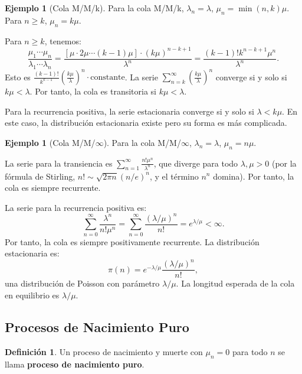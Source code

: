 \documentclass{article}
\theoremstyle{plain}
\theoremstyle{definition}
\newtheorem{Definicion}[Teorema]{Definici\'on}
\newtheorem{Ejemplo}[Teorema]{Ejemplo}
\begin{document}
\begin{Ejemplo}[Cola M/M/k]
  Para la cola M/M/k, $\lambda_n = \lambda$, $\mu_n = \min(n,k)\mu$. Para $n \geq k$, $\mu_n = k\mu$.
  
  Para $n \geq k$, tenemos:
  \[ \frac{\mu_1 \cdots \mu_n}{\lambda_1 \cdots \lambda_n} = \frac{[\mu \cdot 2\mu \cdots (k-1)\mu] \cdot (k\mu)^{n-k+1}}{\lambda^n} = \frac{(k-1)! k^{n-k+1} \mu^n}{\lambda^n}. \]
  Esto es $\frac{(k-1)!}{k^{k-1}} \left(\frac{k\mu}{\lambda}\right)^n \cdot \text{constante}$. La serie $\sum_{n=k}^\infty \left(\frac{k\mu}{\lambda}\right)^n$ converge si y solo si $k\mu < \lambda$. Por tanto, la cola es transitoria si $k\mu < \lambda$.
  
  Para la recurrencia positiva, la serie estacionaria converge si y solo si $\lambda < k\mu$. En este caso, la distribuci\'on estacionaria existe pero su forma es m\'as complicada.
\end{Ejemplo}

\begin{Ejemplo}[Cola M/M/$\infty$]
  Para la cola M/M/$\infty$, $\lambda_n = \lambda$, $\mu_n = n\mu$.
  
  La serie para la transiencia es $\sum_{n=1}^\infty \frac{n! \mu^n}{\lambda^n}$, que diverge para todo $\lambda, \mu > 0$ (por la f\'ormula de Stirling, $n! \sim \sqrt{2\pi n}(n/e)^n$, y el t\'ermino $n^n$ domina). Por tanto, la cola es siempre recurrente.
  
  La serie para la recurrencia positiva es:
  \[ \sum_{n=0}^\infty \frac{\lambda^n}{n! \mu^n} = \sum_{n=0}^\infty \frac{(\lambda/\mu)^n}{n!} = e^{\lambda/\mu} < \infty. \]
  Por tanto, la cola es siempre positivamente recurrente. La distribuci\'on estacionaria es:
  \[ \pi(n) = e^{-\lambda/\mu} \frac{(\lambda/\mu)^n}{n!}, \]
  una distribuci\'on de Poisson con par\'ametro $\lambda/\mu$. La longitud esperada de la cola en equilibrio es $\lambda/\mu$.
\end{Ejemplo}

\subsection{Procesos de Nacimiento Puro}

\begin{Definicion}
  Un proceso de nacimiento y muerte con $\mu_n = 0$ para todo $n$ se llama \textbf{proceso de nacimiento puro}.
\end{Definicion}
\end{document}
